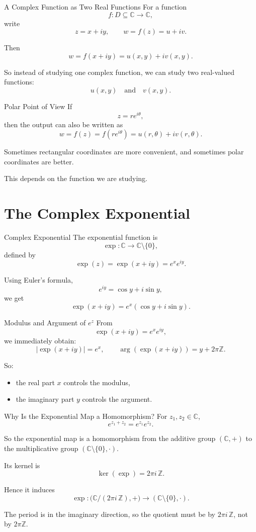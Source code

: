 \documentclass[11pt]{beamer}
\theoremstyle{definition}
\theoremstyle{plain}
\newcommand{\C}{\mathbb{C}}
\begin{document}
\begin{frame}{A Complex Function as Two Real Functions}
For a function
\[
f:D\subseteq\C\to\C,
\]
write
\[
z=x+iy,\qquad w=f(z)=u+iv.
\]

Then
\[
w=f(x+iy)=u(x,y)+iv(x,y).
\]

So instead of studying one complex function, we can study two real-valued functions:
\[
u(x,y)\quad\text{and}\quad v(x,y).
\]
\end{frame}

\begin{frame}{Polar Point of View}
If
\[
z=re^{i\theta},
\]
then the output can also be written as
\[
w=f(z)=f(re^{i\theta})=u(r,\theta)+iv(r,\theta).
\]

Sometimes rectangular coordinates are more convenient, and sometimes polar coordinates are better.

This depends on the function we are studying.
\end{frame}

\section{The Complex Exponential}

\begin{frame}{Complex Exponential}
The exponential function is
\[
\exp:\C\to\C\setminus\{0\},
\]
defined by
\[
\exp(z)=\exp(x+iy)=e^x e^{iy}.
\]

Using Euler's formula,
\[
e^{iy}=\cos y+i\sin y,
\]
we get
\[
\exp(x+iy)=e^x(\cos y+i\sin y).
\]
\end{frame}

\begin{frame}{Modulus and Argument of \(e^z\)}
From
\[
\exp(x+iy)=e^x e^{iy},
\]
we immediately obtain:
\[
\left|\exp(x+iy)\right|=e^x,
\qquad
\arg(\exp(x+iy))=y+2\pi\mathbb{Z}.
\]

So:
\begin{itemize}
    \item the real part \(x\) controls the modulus,
    \item the imaginary part \(y\) controls the argument.
\end{itemize}
\end{frame}

\begin{frame}{Why Is the Exponential Map a Homomorphism?}
For \(z_1,z_2\in\C\),
\[
e^{z_1+z_2}=e^{z_1}e^{z_2}.
\]

So the exponential map is a homomorphism from the additive group \((\C,+)\) to the multiplicative group \((\C\setminus\{0\},\cdot)\).

Its kernel is
\[
\ker(\exp)=2\pi i\,\mathbb{Z}.
\]

Hence it induces
\[
\exp:\bigl(\C/(2\pi i\,\mathbb Z),+\bigr)\to(\C\setminus\{0\},\cdot).
\]

\begin{tcolorbox}
The period is in the imaginary direction, so the quotient must be by \(2\pi i\,\mathbb Z\), not by \(2\pi\mathbb Z\).
\end{tcolorbox}
\end{frame}
\end{document}
